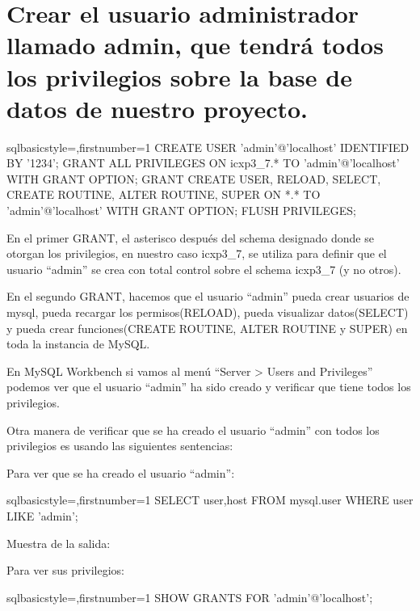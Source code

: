 \section{Crear el usuario administrador llamado admin, que tendrá todos los privilegios sobre la base de datos de nuestro proyecto.}
	\begin{sourcecodep}[]{sql}{basicstyle={\fontsize{10}{10}\selectfont\ttfamily},firstnumber=1}{}
		CREATE USER 'admin'@'localhost' IDENTIFIED BY '1234';
		GRANT ALL PRIVILEGES ON icxp3_7.* TO 'admin'@'localhost' WITH GRANT OPTION;
		GRANT
			CREATE USER,
			RELOAD,
			SELECT,
			CREATE ROUTINE,
			ALTER ROUTINE,
			SUPER
			ON *.* TO 'admin'@'localhost'
			WITH GRANT OPTION;
		FLUSH PRIVILEGES;\end{sourcecodep}
	\newp En el primer GRANT, el asterisco después del schema designado donde se otorgan los privilegios, en nuestro caso icxp3\_7, se utiliza para definir que el usuario “admin” se crea con total control sobre el schema icxp3\_7 (y no otros).
	
	\newp En el segundo GRANT, hacemos que el usuario “admin” pueda crear usuarios de mysql, pueda recargar los permisos(RELOAD), pueda visualizar datos(SELECT) y pueda crear funciones(CREATE ROUTINE, ALTER ROUTINE y SUPER) en toda la instancia de MySQL.
	
	\newp En MySQL Workbench si vamos al menú “Server > Users and Privileges” podemos ver que el usuario “admin” ha sido creado y verificar que tiene todos los privilegios.
	
	
	Otra manera de verificar que se ha creado el usuario “admin” con todos los privilegios es usando las siguientes sentencias:
	
	\newp Para ver que se ha creado el usuario “admin”:
	\begin{sourcecodep}[]{sql}{basicstyle={\fontsize{10}{10}\selectfont\ttfamily},firstnumber=1}{}
		SELECT user,host FROM mysql.user WHERE user LIKE 'admin';\end{sourcecodep}
	
	\newp Muestra de la salida:
	
	\newp Para ver sus privilegios:
	\begin{sourcecodep}[]{sql}{basicstyle={\fontsize{10}{10}\selectfont\ttfamily},firstnumber=1}{}
		SHOW GRANTS FOR 'admin'@'localhost';\end{sourcecodep}
	
